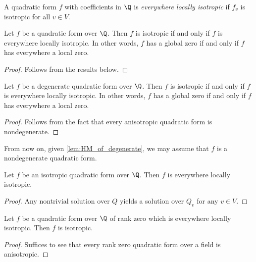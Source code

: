 \begin{definition}\label{def:everywhere_locally_isotropic}
\leanok
A quadratic form $f$ with coefficients in $\Q$ is \emph{everywhere locally isotropic} if $f_v$ is isotropic for all $v \in V$.
\end{definition}

\begin{theorem}\label{thm:Hasse-Minkowski}
\leanok
Let $f$ be a quadratic form over $\Q$. Then $f$ is isotropic if and only if $f$ is everywhere locally isotropic. In other words, $f$ has a global zero if and only if $f$ has everywhere a local zero.
\end{theorem}
\begin{proof}
Follows from the results below.
\end{proof}

\begin{theorem}\label{lem:HM_of_degenerate}
	\leanok
	Let $f$ be a degenerate quadratic form over $\Q$. Then $f$ is isotropic if and only if $f$ is everywhere locally isotropic. In other words, $f$ has a global zero if and only if $f$ has everywhere a local zero.
\end{theorem}
\begin{proof}
\leanok
Follows from the fact that every anisotropic quadratic form is nondegenerate.
\end{proof}

From now on, given \ref{lem:HM_of_degenerate}, we may assume that $f$ is a nondegenerate quadratic form.

\begin{lemma}\label{lem:ev_loc_isotr_of_isotr}
\leanok
Let $f$ be an isotropic quadratic form over $\Q$. Then $f$ is everywhere locally isotropic.
\end{lemma}
\begin{proof}
\leanok
Any nontrivial solution over $Q$ yields a solution over $Q_v$ for any $v \in V$.
\end{proof}

\begin{lemma}\label{lem:isotr_of_rk_zero}
	\leanok
	Let $f$ be a quadratic form over $\Q$ of rank zero which is everywhere locally isotropic. Then $f$ is isotropic.
\end{lemma}
\begin{proof}
\leanok
Suffices to see that every rank zero quadratic form over a field is anisotropic.
\end{proof}


